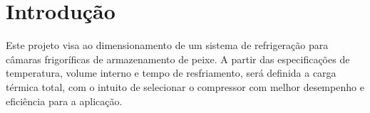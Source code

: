 
\chapter{Introdução}

Este projeto visa ao dimensionamento de um sistema de refrigeração para câmaras frigoríficas de armazenamento de peixe. A partir das especificações de temperatura, volume interno e tempo de resfriamento, será definida a carga térmica total, com o intuito de selecionar o compressor com melhor desempenho e eficiência para a aplicação.